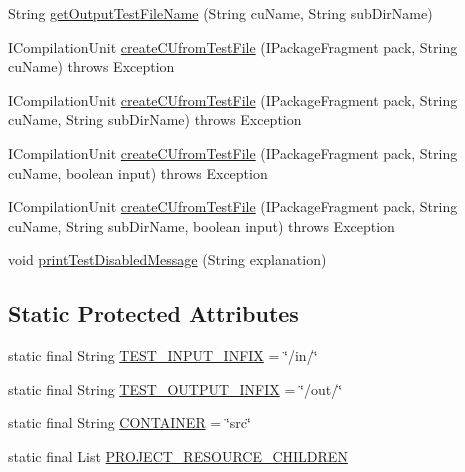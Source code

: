 \begin{DoxyCompactItemize}
String \hyperlink{classorg_1_1eclipse_1_1jdt_1_1ui_1_1tests_1_1refactoring_1_1infra_1_1RefactoringTest_ae0d6c57c7b4957ff6fe46314cb115ed9}{getOutputTestFileName} (String cuName, String subDirName)
\item 
ICompilationUnit \hyperlink{classorg_1_1eclipse_1_1jdt_1_1ui_1_1tests_1_1refactoring_1_1infra_1_1RefactoringTest_ae3b6264b63a6f978dc0d8df91c8a1484}{createCUfromTestFile} (IPackageFragment pack, String cuName)  throws Exception 
\item 
ICompilationUnit \hyperlink{classorg_1_1eclipse_1_1jdt_1_1ui_1_1tests_1_1refactoring_1_1infra_1_1RefactoringTest_a5fa7cd813059fc72050935a9f8d7314c}{createCUfromTestFile} (IPackageFragment pack, String cuName, String subDirName)  throws Exception 
\item 
ICompilationUnit \hyperlink{classorg_1_1eclipse_1_1jdt_1_1ui_1_1tests_1_1refactoring_1_1infra_1_1RefactoringTest_a47dee64785e7f6f24b2ccdea50c316c5}{createCUfromTestFile} (IPackageFragment pack, String cuName, boolean input)  throws Exception 
\item 
ICompilationUnit \hyperlink{classorg_1_1eclipse_1_1jdt_1_1ui_1_1tests_1_1refactoring_1_1infra_1_1RefactoringTest_abef265f18fc02925eda1185599c50d83}{createCUfromTestFile} (IPackageFragment pack, String cuName, String subDirName, boolean input)  throws Exception 
\item 
void \hyperlink{classorg_1_1eclipse_1_1jdt_1_1ui_1_1tests_1_1refactoring_1_1infra_1_1RefactoringTest_a5710b7645df54496f1102285a0860945}{printTestDisabledMessage} (String explanation)
\end{DoxyCompactItemize}
\subsection*{Static Protected Attributes}
\begin{DoxyCompactItemize}
\item 
static final String \hyperlink{classorg_1_1eclipse_1_1jdt_1_1ui_1_1tests_1_1refactoring_1_1infra_1_1RefactoringTest_aa70d88ca205d6286c87e79d4bd70eaab}{TEST\_\-INPUT\_\-INFIX} = \char`\"{}/in/\char`\"{}
\item 
static final String \hyperlink{classorg_1_1eclipse_1_1jdt_1_1ui_1_1tests_1_1refactoring_1_1infra_1_1RefactoringTest_ab3b6c06d50f980b167b4d117915bd1b8}{TEST\_\-OUTPUT\_\-INFIX} = \char`\"{}/out/\char`\"{}
\item 
static final String \hyperlink{classorg_1_1eclipse_1_1jdt_1_1ui_1_1tests_1_1refactoring_1_1infra_1_1RefactoringTest_a8c6f7d52cde9bd241664675f5c0bb7fb}{CONTAINER} = \char`\"{}src\char`\"{}
\item 
static final List \hyperlink{classorg_1_1eclipse_1_1jdt_1_1ui_1_1tests_1_1refactoring_1_1infra_1_1RefactoringTest_a13b97bc899dec84a2a928a647ccad94e}{PROJECT\_\-RESOURCE\_\-CHILDREN}
\end{DoxyCompactItemize}
